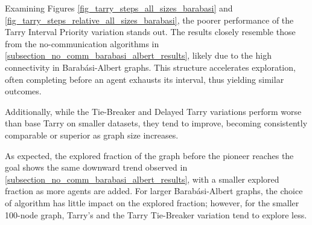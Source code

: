 Examining Figures \ref{fig_tarry_steps_all_sizes_barabasi} and \ref{fig_tarry_steps_relative_all_sizes_barabasi}, the poorer performance of the Tarry Interval Priority variation stands out. The results closely resemble those from the no-communication algorithms in \ref{subsection_no_comm_barabasi_albert_results}, likely due to the high connectivity in Barabási-Albert graphs. This structure accelerates exploration, often completing before an agent exhausts its interval, thus yielding similar outcomes.

Additionally, while the Tie-Breaker and Delayed Tarry variations perform worse than base Tarry on smaller datasets, they tend to improve, becoming consistently comparable or superior as graph size increases.

As expected, the explored fraction of the graph before the pioneer reaches the goal shows the same downward trend observed in \ref{subsection_no_comm_barabasi_albert_results}, with a smaller explored fraction as more agents are added. For larger Barabási-Albert graphs, the choice of algorithm has little impact on the explored fraction; however, for the smaller 100-node graph, Tarry's and the Tarry Tie-Breaker variation tend to explore less.
    
    